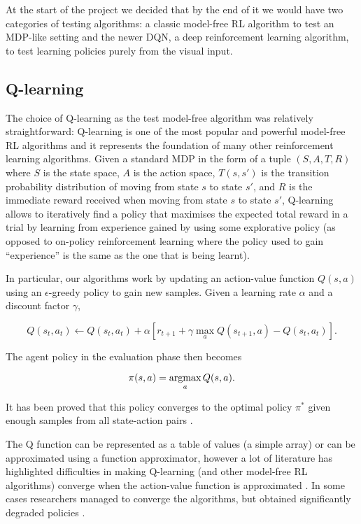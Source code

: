 At the start of the project we decided that by the end of it we would have two
categories of testing algorithms: a classic model-free RL algorithm to test an
MDP-like setting and the newer DQN, a deep reinforcement learning algorithm, to
test learning policies purely from the visual input.

\subsection{Q-learning}

The choice of Q-learning as the test model-free algorithm was relatively
straightforward: Q-learning \citep{watkins1992q} is one of the most popular and
powerful model-free RL algorithms and it represents the foundation of many other
reinforcement learning algorithms. Given a standard MDP in the form of a tuple
$(S, A, T, R)$ where $S$ is the state space, $A$ is the action space, $T(s, s')$
is the transition probability distribution of moving from state $s$ to state
$s'$, and $R$ is the immediate reward received when moving from state $s$ to
state $s'$, Q-learning allows to iteratively find a policy that maximises the
expected total reward in a trial by learning from experience gained by using
some explorative policy (as opposed to on-policy reinforcement learning where
the policy used to gain ``experience'' is the same as the one that is being
learnt).

In particular, our algorithms work by updating an action-value function $Q(s,
a)$ using an $\epsilon$-greedy policy to gain new samples. Given a learning rate
$\alpha$ and a discount factor $\gamma$,

\begin{equation}
  Q(s_t, a_t) \leftarrow Q(s_t, a_t) +
  \alpha \left[ r_{t+1} + \gamma \max_a Q(s_{t+1}, a) - Q(s_t, a_t) \right].
\label{eq:ql}
\end{equation}

The agent policy in the evaluation phase then becomes

\begin{equation}
  \pi(s, a) = \operatornamewithlimits{argmax}_a Q(s, a).
\label{eq:ql2}
\end{equation}

It has been proved that this policy converges to the optimal policy $\pi^*$ given
enough samples from all state-action pairs
\citep{Sutton:1998:IRL:551283}. %

The Q function can be represented as a table of values (a simple array) or can
be approximated using a function approximator, however a lot of literature has
highlighted difficulties in making Q-learning (and other model-free RL
algorithms) converge when the action-value function is approximated
\citep{sutton1999policy}. In some cases researchers managed to converge the
algorithms, but obtained significantly degraded policies
\citep{bertsekas2011approximate, baxter1999direct}.

